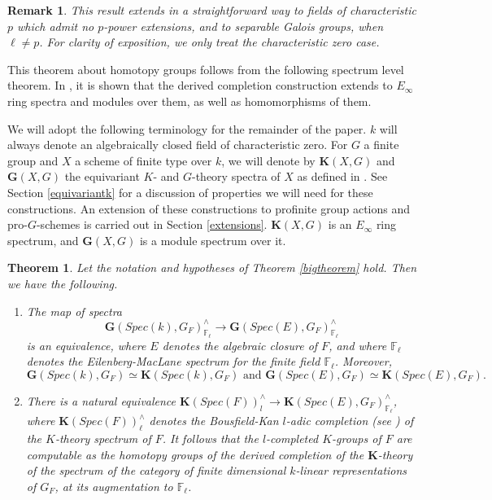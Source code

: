 \documentclass[11pt]{article}
\newcommand\mb{\mathbb}
\def \bK{\mathbf K}
\newcommand\mfk{\mathbf G}
\newtheorem{Theorem}{Theorem}[section]
\newtheorem{Remark}{Remark}[section]
\begin{document}
\begin{Remark}
    This result extends in a straightforward way to fields of characteristic $p$ which admit no $p$-power extensions, and to separable Galois groups, when $\ell \neq p$.  For clarity of exposition, we only treat the characteristic zero case.  
\end{Remark}

This theorem about homotopy groups follows from the following spectrum level theorem.  
In \cite{completion}, it is shown  that the derived completion construction extends to $E_{\infty}$ ring spectra and  modules over them,  as well as  homomorphisms of them.  

We will adopt the following terminology for the remainder of the paper. $k$ will always denote an algebraically closed field of characteristic zero.  For $G$ a finite group and $X$ a scheme of finite type over $k$, we will denote by $\bK(X,G) $ and $\mfk(X,G)$ the equivariant  $K$- and $G$-theory spectra of $X$ as defined in \cite[ section 2]{royg2}. See Section \ref{equivariantk} for a discussion of properties we will need for these constructions. An extension of these constructions to profinite group actions and pro-$G$-schemes is carried out in Section \ref{extensions}.  $\bK(X,G) $ is an $E_{\infty}$ ring spectrum, and $\mfk (X,G) $ is a module spectrum over it.  


\begin{Theorem}\label{nextbigtheorem} 
Let the notation and hypotheses of Theorem \ref{bigtheorem} hold. Then we have the following.  
 \begin{enumerate}[label=(\arabic*), font=\upshape] \item{The map of spectra 
 $$\mfk(Spec(k), G_F )_{\mb{F}_{\ell} }^{\wedge} \rightarrow \mfk(Spec(E), G_F )^{\wedge} _{\mb{F}_{\ell}} 
 $$
 is an equivalence, where $E$ denotes the algebraic  closure of $F$,   and where $\mb{F}_{\ell}$ denotes the Eilenberg-MacLane spectrum for the finite field $\mb{F}_{\ell}$. 
 Moreover,
 $$\mfk(Spec(k), G_F) \simeq \bK(Spec(k), G_F) \mbox{ and } \mfk(Spec(E), G_F) \simeq \bK(Spec(E), G_F).$$}
 \item{There is a natural  equivalence  $\bK(Spec(F))^{\wedge}_{l} \rightarrow \bK(Spec(E), G_F )^{\wedge} _{\mb{F}_{\ell}}   $, where $\bK(Spec(F)) ^{\wedge}_{\ell}$ denotes the Bousfield-Kan $l$-adic completion (see \cite{bousfield}) of the $K$-theory spectrum of $F$.  It follows that the $l$-completed  $K$-groups of $F$ are computable as the homotopy groups of the derived completion of the $\bK$-theory of  the spectrum of the category of finite dimensional  $k$-linear representations of $G_F$, at its augmentation to $\mb{F}_{\ell}$.
 }
 \end{enumerate}
 
\end{Theorem}
\end{document}
